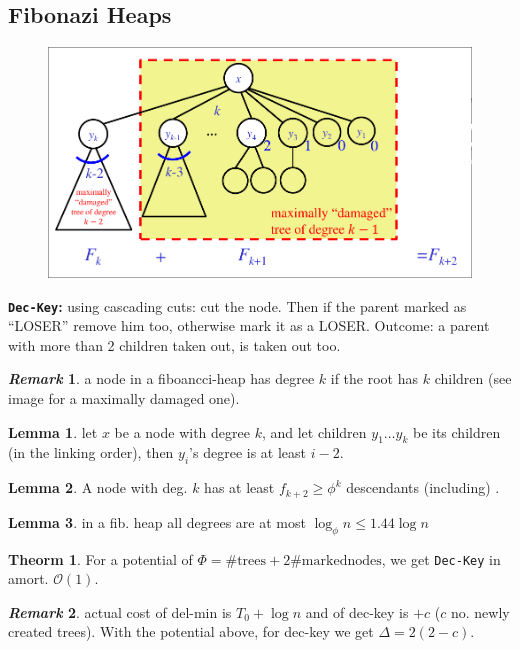 \documentclass[]{article}
\newcommand\compactsubsection[1]        {\vspace{-10pt}\subsection{#1}\vspace{-6pt}}
\theoremstyle{definition}
\newtheorem{Theorem}{\color{theoColor}Theorm}
\newtheorem{Lemma}{\color{lemColor}Lemma}
\newtheorem{Remark}{\textit{Remark}}
\newcommand\theo  [1] {\begin{Theorem}#1\end{Theorem}}
\newcommand\lem   [1] {\begin{Lemma}#1\end{Lemma}}
\newcommand\oc    {\mathcal{O}}
\newcommand\Dg        {\Delta}
\newcommand\logn      {\log n}
\begin{document}
\begin{multicols}{4}
			\vspace{-6pt}
			\compactsubsection{Fibonazi Heaps}
				\begin{figure}
					\includegraphics[width=\linewidth]{images/maxDamageFibonazi}
				\end{figure}
				\textbf{\texttt{Dec-Key}: }using cascading cuts: cut the node. Then if the parent marked as ``LOSER'' remove him too, otherwise mark it as a LOSER. Outcome: a parent with more than 2 children taken out, is taken out too. 
				\begin{Remark}
					a node in a fiboancci-heap has degree $k$ if the root has $k$ children (see image for a maximally damaged one). 
				\end{Remark}
				
				\lem{let $x$ be a node with degree $k$, and let children $y_1 \dots y_k$ be its children (in the linking order), then $y_i$'s degree is at least $i - 2$. }
				\lem{A node with deg. $k$ has at least $f_{k + 2} \ge \phi^{k}$ descendants (including) . }
				\lem{in a fib. heap all degrees are at most $\log_{\phi}n \le 1.44 \log n$}
				\theo{For a potential of $\Phi = \# \mathrm{trees} + 2\# \mathrm{marked nodes}$, we get \texttt{Dec-Key} in amort. $\oc(1)$. }
				\begin{Remark}
					actual cost of del-min is $T_0 + \logn$ and of dec-key is $+c$ ($c$ no. newly created trees). With the potential above, for dec-key we get $\Dg = 2(2 - c)$. 
				\end{Remark}
		

\end{multicols}
\end{document}
